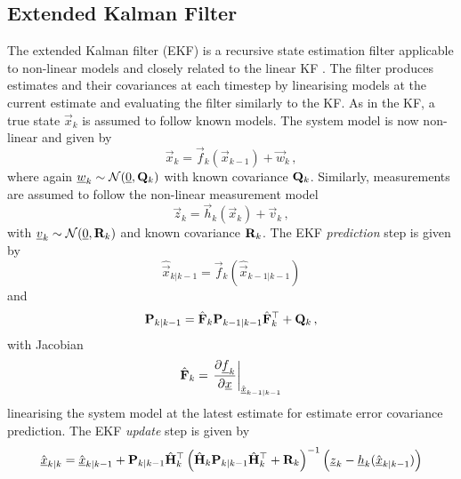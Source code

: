 \subsection{Extended Kalman Filter}\label{subsec:prelims:ekf}
The extended Kalman filter (EKF) is a recursive state estimation filter applicable to non-linear models and closely related to the linear KF \cite{andersonOptimalFiltering1979,theanalyticsciencescorporationAppliedOptimalEstimation1974}. The filter produces estimates and their covariances at each timestep by linearising models at the current estimate and evaluating the filter similarly to the KF. As in the KF, a true state $\vec{x}_k$ is assumed to follow known models. The system model is now non-linear and given by
\begin{equation}\label{eq:prelims:nonlin_gauss_system_model}
    \vec{x}_k = \vec{f}_k(\vec{x}_{k-1}) + \vec{w}_k\,,
\end{equation}
where again ${\underline{w}}_k \sim \mathcal{N}({\underline{0}}, {{\mathbf{Q}}}_k)$ with known covariance ${{\mathbf{Q}}}_k$. Similarly, measurements are assumed to follow the non-linear measurement model
\begin{equation}\label{eq:prelims:nonlin_gauss_measurement_model}
    \vec{z}_k = \vec{h}_k(\vec{x}_k) + \vec{v}_k\,,
\end{equation}
with ${\underline{v}}_k \sim \mathcal{N}({\underline{0}}, {{\mathbf{R}}}_k)$ and known covariance ${{\mathbf{R}}}_k$. The EKF \textit{prediction} step is given by
\begin{equation}\label{eq:prelims:ekf_est_predict}
    \hat{\vec{x}}_{k|k-1} = \vec{f}_k\left(\hat{\vec{x}}_{k-1|k-1}\right)
\end{equation}
and
\begin{equation}\label{eq:prelims:ekf_cov_predict}
    {\ensuremath{{\mathbf{P}}}}_{k|k-1} = \hat{{{\mathbf{F}}}}_k {{\mathbf{P}}}_{k-1|k-1} \hat{{{\mathbf{F}}}}_k^\top + {{\mathbf{Q}}}_k\,,
\end{equation}
with Jacobian
\begin{equation}\label{eq:prelims:ekf_predict_jacobian}
    \hat{{{\mathbf{F}}}}_k = \left.\frac{\partial {\underline{f}}_k}{\partial {\underline{x}}}\right|_{\hat{{\underline{x}}}_{k-1|k-1}}
\end{equation}
linearising the system model at the latest estimate for estimate error covariance prediction. The EKF \textit{update} step is given by
\begin{equation}\label{eq:prelims:ekf_est_update}
    \hat{{\underline{x}}}_{k|k} = \hat{{\underline{x}}}_{k|k-1}+{{\mathbf{P}}}_{k|k-1}\hat{{{\mathbf{H}}}}_k^\top\left(\hat{{{\mathbf{H}}}}_k{{\mathbf{P}}}_{k|k-1}\hat{{{\mathbf{H}}}}_k^\top + {{\mathbf{R}}}_k\right)^{-1}\left({\underline{z}}_k-{\underline{h}}_k(\hat{{\underline{x}}}_{k|k-1})\right)
\end{equation}
